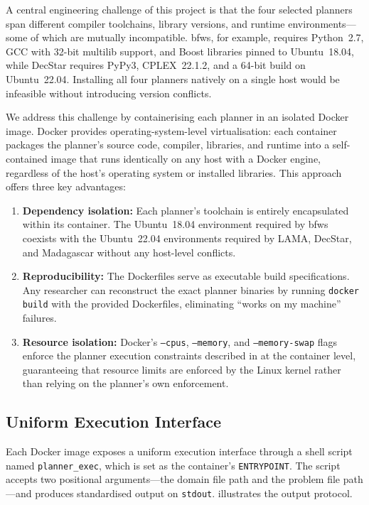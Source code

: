 A central engineering challenge of this project is that the four selected planners span different compiler toolchains, library versions, and runtime environments---some of which are mutually incompatible.
\gls{bfws}, for example, requires Python~2.7, GCC with 32-bit multilib support, and Boost libraries pinned to Ubuntu~18.04, while DecStar requires PyPy3, CPLEX~22.1.2, and a 64-bit build on Ubuntu~22.04.
Installing all four planners natively on a single host would be infeasible without introducing version conflicts.

We address this challenge by containerising each planner in an isolated Docker~\cite{Merkel2014} image.
Docker provides operating-system-level virtualisation: each container packages the planner's source code, compiler, libraries, and runtime into a self-contained image that runs identically on any host with a Docker engine, regardless of the host's operating system or installed libraries.
This approach offers three key advantages:

\begin{enumerate}
  \item \textbf{Dependency isolation:} Each planner's toolchain is entirely encapsulated within its container. The Ubuntu~18.04 environment required by \gls{bfws} coexists with the Ubuntu~22.04 environments required by LAMA, DecStar, and Madagascar without any host-level conflicts.

  \item \textbf{Reproducibility:} The Dockerfiles serve as executable build specifications. Any researcher can reconstruct the exact planner binaries by running \texttt{docker build} with the provided Dockerfiles, eliminating ``works on my machine'' failures.

  \item \textbf{Resource isolation:} Docker's \texttt{--cpus}, \texttt{--memory}, and \texttt{--memory-swap} flags enforce the planner execution constraints described in  at the container level, guaranteeing that resource limits are enforced by the Linux kernel rather than relying on the planner's own enforcement.
\end{enumerate}

\subsection{Uniform Execution Interface}
\label{sec:impl:docker:interface}

Each Docker image exposes a uniform execution interface through a shell script named \texttt{planner\_exec}, which is set as the container's \texttt{ENTRYPOINT}.
The script accepts two positional arguments---the domain file path and the problem file path---and produces standardised output on \texttt{stdout}.
 illustrates the output protocol.


